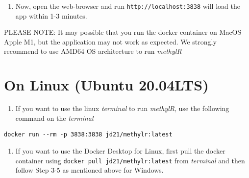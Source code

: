 \documentclass[
  a4paper,
  DIV=11,
  numbers=noendperiod,
  oneside,
  open=any]{scrreport}
\providecommand{\tightlist}{%
  \setlength{\itemsep}{0pt}\setlength{\parskip}{0pt}}\usepackage{longtable,booktabs,array}
\begin{document}
\begin{enumerate}
\def\labelenumi{\arabic{enumi}.}
\setcounter{enumi}{4}
\tightlist
\item
  Now, open the web-browser and run \texttt{http://localhost:3838} will
  load the app within 1-3 minutes.
\end{enumerate}

\begin{tcolorbox}[enhanced jigsaw, breakable, colback=white, colbacktitle=quarto-callout-note-color!10!white, opacityback=0, left=2mm, bottomrule=.15mm, opacitybacktitle=0.6, coltitle=black, bottomtitle=1mm, toprule=.15mm, toptitle=1mm, arc=.35mm, titlerule=0mm, rightrule=.15mm, title=\textcolor{quarto-callout-note-color}{\faInfo}\hspace{0.5em}{Note}, colframe=quarto-callout-note-color-frame, leftrule=.75mm]

PLEASE NOTE: It may possible that you run the docker container on MacOS
Apple M1, but the application may not work as expected. We strongly
recommend to use AMD64 OS architecture to run \emph{methylR}

\end{tcolorbox}

\section{On Linux (Ubuntu 20.04LTS)}\label{on-linux-ubuntu-20.04lts}

\begin{enumerate}
\def\labelenumi{\arabic{enumi}.}
\tightlist
\item
  If you want to use the linux \emph{terminal} to run \emph{methylR},
  use the following command on the \emph{terminal}
\end{enumerate}

\begin{verbatim}
docker run --rm -p 3838:3838 jd21/methylr:latest
\end{verbatim}

\begin{enumerate}
\def\labelenumi{\arabic{enumi}.}
\setcounter{enumi}{1}
\tightlist
\item
  If you want to use the Docker Desktop for Linux, first pull the docker
  container using \texttt{docker\ pull\ jd21/methylr:latest} from
  \emph{terminal} and then follow Step 3-5 as mentioned above for
  Windows.
\end{enumerate}
\end{document}
